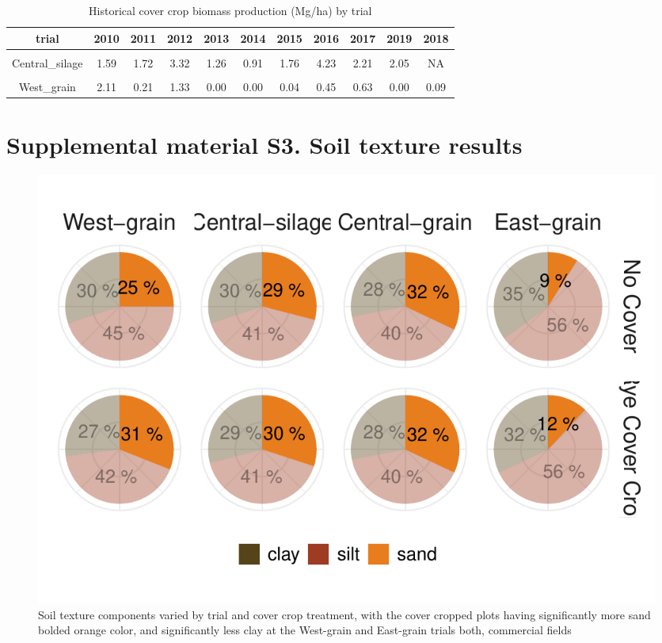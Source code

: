 \documentclass[
]{article}
\begin{document}
\begin{table}[H]

\caption{\label{tab:ccbio}Historical cover crop biomass production (Mg/ha) by trial}
\centering
\begin{tabular}[t]{ccccccccccc}
\toprule
trial & 2010 & 2011 & 2012 & 2013 & 2014 & 2015 & 2016 & 2017 & 2019 & 2018\\
\midrule
\cellcolor{gray!6}{Central\_grain} & \cellcolor{gray!6}{0.86} & \cellcolor{gray!6}{0.28} & \cellcolor{gray!6}{1.37} & \cellcolor{gray!6}{0.25} & \cellcolor{gray!6}{0.47} & \cellcolor{gray!6}{0.61} & \cellcolor{gray!6}{2.22} & \cellcolor{gray!6}{2.76} & \cellcolor{gray!6}{1.29} & \cellcolor{gray!6}{NA}\\
Central\_silage & 1.59 & 1.72 & 3.32 & 1.26 & 0.91 & 1.76 & 4.23 & 2.21 & 2.05 & NA\\
\cmidrule{1-11}
\cellcolor{gray!6}{East\_grain} & \cellcolor{gray!6}{2.11} & \cellcolor{gray!6}{1.46} & \cellcolor{gray!6}{0.00} & \cellcolor{gray!6}{0.92} & \cellcolor{gray!6}{0.00} & \cellcolor{gray!6}{0.36} & \cellcolor{gray!6}{0.51} & \cellcolor{gray!6}{7.30} & \cellcolor{gray!6}{0.30} & \cellcolor{gray!6}{0.19}\\
West\_grain & 2.11 & 0.21 & 1.33 & 0.00 & 0.00 & 0.04 & 0.45 & 0.63 & 0.00 & 0.09\\
\bottomrule
\end{tabular}
\end{table}

\newpage

\hypertarget{supplemental-material-s3.-soil-texture-results}{%
\section{Supplemental material S3. Soil texture
results}\label{supplemental-material-s3.-soil-texture-results}}

\begin{figure}
\centering
\includegraphics{rmd-supp-mat_files/figure-latex/texture-1.pdf}
\caption{Soil texture components varied by trial and cover crop
treatment, with the cover cropped plots having significantly more sand
bolded orange color, and significantly less clay at the West-grain and
East-grain trials both, commercial fields}
\end{figure}
\end{document}
